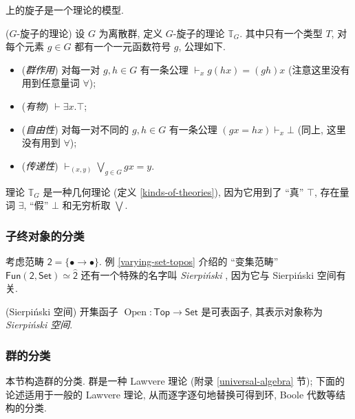 \topos{}上的旋子是一个理论的模型.

\begin{definition}
	{($G$-旋子的理论)}
	设 $G$ 为离散群, 定义 $G$-旋子的理论 $\mathbb T_G$.
	其中只有一个类型 $T$, 对每个元素 $g\in G$ 都有一个一元函数符号 $g$, 公理如下.
	\begin{itemize}
		\item (\emph{群作用}) 对每一对 $g,h\in G$ 有一条公理 $\vdash_x g(hx)=(gh)x$ (注意这里没有用到任意量词 $\forall$);
		\item (\emph{有物}) $\vdash \exists x. \top$;
		\item (\emph{自由性}) 对每一对不同的 $g,h\in G$ 有一条公理 $(gx=hx)\vdash_x \bot$ (同上, 这里没有用到 $\forall$);
		\item (\emph{传递性}) $\displaystyle\vdash_{(x,y)}\bigvee_{g\in G}gx=y$.
	\end{itemize}
\end{definition}

理论 $\mathbb T_G$ 是一种几何理论 (定义 \ref{kinds-of-theories}), 因为它用到了 ``真'' $\top$, 存在量词 $\exists$, ``假'' $\bot$ 和无穷析取 $\bigvee$.

\subsubsection{子终对象的分类\topos}

考虑范畴 $\mathsf 2 = \{\bullet\longrightarrow\bullet\}$. 例 \ref{varying-set-topos} 介绍的 ``变集范畴'' $\mathsf {Fun}(\mathsf {2},\mathsf {Set})\simeq\widehat {\mathsf {2}}$ 还有一个特殊的名字叫 \emph{Sierpi\'nski \topos{}}, 因为它与 Sierpi\'nski 空间有关.

\begin{propdef}
	[label={Sierpinski-space}]
	{(Sierpi\'nski 空间)}
	开集函子 $\operatorname{Open}\colon \mathsf {Top}\to \mathsf {Set}$ 是可表函子, 其表示对象称为 \emph{Sierpi\'nski 空间}.
\end{propdef}

\todo{}

\subsubsection{群的分类\topos{}}

本节构造群的分类\topos{}. 群是一种 Lawvere 理论 (附录 \ref{universal-algebra} 节); 下面的论述适用于一般的 Lawvere 理论, 从而逐字逐句地替换可得到环, Boole 代数等结构的分类\topos{}.
%

